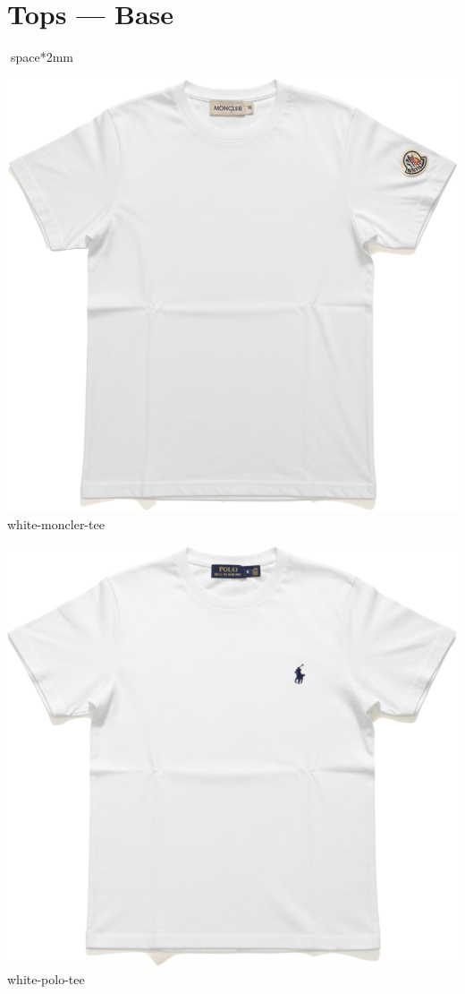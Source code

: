 \documentclass[10pt]{article}
\begin{document}
\section*{Tops — Base}space*{2mm}
\begin{minipage}[t]{0.22\textwidth}\centering\vspace{0mm}
\includegraphics[width=\linewidth,keepaspectratio]{assets/tees/white-moncler-tee.png}\\
\vspace{0.5mm}\tiny white-moncler-tee\end{minipage}
\begin{minipage}[t]{0.22\textwidth}\centering\vspace{0mm}
\includegraphics[width=\linewidth,keepaspectratio]{assets/tees/white-polo-tee.png}\\
\vspace{0.5mm}\tiny white-polo-tee\end{minipage}
\end{document}
